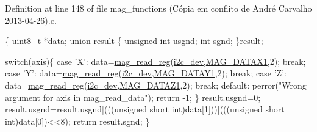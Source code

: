 Definition at line 148 of file mag\-\_\-functions (\-Cópia em conflito de André Carvalho 2013-\/04-\/26).\-c.


\begin{DoxyCode}
\{
  uint8\_t *data;
  \textcolor{keyword}{union }result
  \{
    \textcolor{keywordtype}{unsigned} \textcolor{keywordtype}{int} usgnd;
    \textcolor{keywordtype}{int} sgnd;
  \}result;

  \textcolor{keywordflow}{switch}(axis)\{
    \textcolor{keywordflow}{case} \textcolor{charliteral}{'X'}:
      data=\hyperlink{imu__functions_01_07C_xC3_xB3pia_01em_01conflito_01de_01Andr_xC3_xA9_01Carvalho_012013-04-26_08_8h_a6830eaeae2298320e1e8c902e4edd709}{mag\_read\_reg}(\hyperlink{CommunicationV0_2communication_8c_a7751bd45ac1064efb35adf1f19c25db8}{i2c\_dev},\hyperlink{communication_2imu__regs_8h_a4f883328e7ae117996e334145ddd0032}{MAG\_DATAX1},2);
      \textcolor{keywordflow}{break};
    \textcolor{keywordflow}{case} \textcolor{charliteral}{'Y'}:
      data=\hyperlink{imu__functions_01_07C_xC3_xB3pia_01em_01conflito_01de_01Andr_xC3_xA9_01Carvalho_012013-04-26_08_8h_a6830eaeae2298320e1e8c902e4edd709}{mag\_read\_reg}(\hyperlink{CommunicationV0_2communication_8c_a7751bd45ac1064efb35adf1f19c25db8}{i2c\_dev},\hyperlink{communication_2imu__regs_8h_ae218906702b1e40c2b6970f97dd0cfe4}{MAG\_DATAY1},2);
      \textcolor{keywordflow}{break};
    \textcolor{keywordflow}{case} \textcolor{charliteral}{'Z'}:
      data=\hyperlink{imu__functions_01_07C_xC3_xB3pia_01em_01conflito_01de_01Andr_xC3_xA9_01Carvalho_012013-04-26_08_8h_a6830eaeae2298320e1e8c902e4edd709}{mag\_read\_reg}(\hyperlink{CommunicationV0_2communication_8c_a7751bd45ac1064efb35adf1f19c25db8}{i2c\_dev},\hyperlink{communication_2imu__regs_8h_a81d7d9236ec69a1a229e4fa7c6299fde}{MAG\_DATAZ1},2);
      \textcolor{keywordflow}{break};
    \textcolor{keywordflow}{default}:
      perror(\textcolor{stringliteral}{"Wrong argument for axis in mag\_read\_data"});
      \textcolor{keywordflow}{return} -1;
  \}
  result.usgnd=0;
  result.usgnd=result.usgnd|(((\textcolor{keywordtype}{unsigned} \textcolor{keywordtype}{short} int)data[1]))|(((\textcolor{keywordtype}{unsigned} \textcolor{keywordtype}{short} \textcolor{keywordtype}{
      int})data[0])<<8);
  \textcolor{keywordflow}{return} result.sgnd;
\}\end{DoxyCode}
